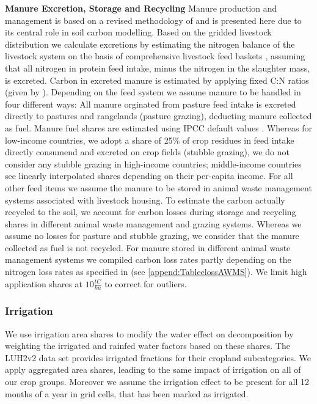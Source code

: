 \documentclass[gc, manuscript]{copernicus}
\begin{document}
\textbf{Manure Excretion, Storage and Recycling}
Manure production and management is based on a revised methodology of \citep{bodirsky_n2o_2012} and is presented here due to its central role in soil carbon modelling. Based on the gridded livestock distribution we calculate excretions by estimating the nitrogen balance of the livestock system on the basis of comprehensive livestock feed baskets \citep{weindl}, assuming that all nitrogen in protein feed intake, minus the nitrogen in the slaughter mass, is excreted. Carbon in excreted manure is estimated by applying fixed C:N ratios (given by \citep{ipcc_2019_2019}).
Depending on the feed system we assume manure to be handled in four different ways:
All manure orginated from pasture feed intake is excreted directly to pastures and rangelands (pasture grazing), deducting manure collected as fuel. Manure fuel shares are estimated using IPCC default values \citep{ippc_2006_2006}.
Whereas for low-income countries, we adopt a share of 25\% of crop residues in feed intake directly consumend and excreted on crop fields (stubble grazing), we do not consider any stubble grazing in high-income countries; middle-income countries see linearly interpolated shares depending on their per-capita income.
For all other feed items we assume the manure to be stored in animal waste management systems associated with livestock housing.
To estimate the carbon actually recycled to the soil, we account for carbon losses during storage and recycling shares in different animal waste management and grazing systems. Whereas we assume no losses for pasture and stubble grazing, we consider that the manure collected as fuel is not recycled. For manure stored in different animal waste management systems we compiled carbon loss rates partly depending on the nitrogen loss rates as specified in \citep{bodirsky_n2o_2012} (see \ref{append:TableclossAWMS}). We limit high application shares at \(10\tfrac{\unit{tC}}{\unit{ha}}\) to correct for outliers.

\hypertarget{sec:irrigation}{%
\subsubsection{Irrigation}\label{sec:irrigation}}

We use irrigation area shares to modify the water effect on decomposition by weighting the irrigated and rainfed water factors based on these shares. The LUH2v2 data set provides irrigated fractions for their cropland subcategories. We apply aggregated area shares, leading to the same impact of irrigation on all of our crop groups. Moreover we assume the irrigation effect to be present for all 12 months of a year in grid cells, that has been marked as irrigated.
\end{document}

